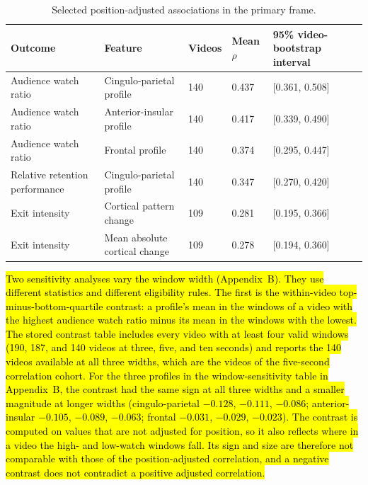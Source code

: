 \documentclass{ieeeaccess}
\newcommand{\rev}[1]{\hl{#1}}
\newcommand{\rev}[1]{#1}
\begin{document}
\begin{table}[t]
\caption{Selected position-adjusted associations in the primary frame.}
\label{tab:associations}
\centering
\renewcommand{\arraystretch}{1.1}
\tablebodyfont
\begin{tabular}{@{}lllll@{}}
\toprule
Outcome & Feature & Videos & Mean $\rho$ & 95\% video-bootstrap interval \\
\midrule
Audience watch ratio & Cingulo-parietal profile & 140 & 0.437 & [0.361, 0.508] \\
Audience watch ratio & Anterior-insular profile & 140 & 0.417 & [0.339, 0.490] \\
Audience watch ratio & Frontal profile & 140 & 0.374 & [0.295, 0.447] \\
Relative retention performance & Cingulo-parietal profile & 140 & 0.347 & [0.270, 0.420] \\
Exit intensity & Cortical pattern change & 109 & 0.281 & [0.195, 0.366] \\
Exit intensity & Mean absolute cortical change & 109 & 0.278 & [0.194, 0.360] \\
\bottomrule
\end{tabular}
\end{table}

\rev{Two sensitivity analyses vary the window width (Appendix~B). They use different statistics and different eligibility rules. The first is the within-video top-minus-bottom-quartile contrast: a profile's mean in the windows of a video with the highest audience watch ratio minus its mean in the windows with the lowest. The stored contrast table includes every video with at least four valid windows (190, 187, and 140 videos at three, five, and ten seconds) and reports the 140 videos available at all three widths, which are the videos of the five-second correlation cohort. For the three profiles in the window-sensitivity table in Appendix~B, the contrast had the same sign at all three widths and a smaller magnitude at longer widths (cingulo-parietal $-0.128$, $-0.111$, $-0.086$; anterior-insular $-0.105$, $-0.089$, $-0.063$; frontal $-0.031$, $-0.029$, $-0.023$). The contrast is computed on values that are not adjusted for position, so it also reflects where in a video the high- and low-watch windows fall. Its sign and size are therefore not comparable with those of the position-adjusted correlation, and a negative contrast does not contradict a positive adjusted correlation.}
\end{document}
